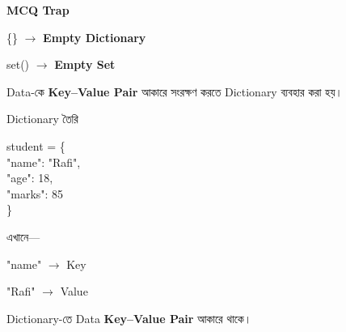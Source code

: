 \begin{rememberbox}

\textbf{\color{deepOrange}MCQ Trap}

\begin{center}

\textenglish{\ttfamily \{\}}
\(\longrightarrow\)
\textbf{Empty Dictionary}

\qquad

\textenglish{\ttfamily set()}
\(\longrightarrow\)
\textbf{Empty Set}

\end{center}

\end{rememberbox}



Data-কে \textbf{Key--Value Pair} আকারে সংরক্ষণ করতে
Dictionary ব্যবহার করা হয়।

\begin{codeoutputbox}{Dictionary তৈরি}

\noindent
\begin{minipage}[t]{0.56\linewidth}
\codeheading

\begin{english}
\ttfamily
student = \{\\
\hspace*{4mm}"name": "Rafi",\\
\hspace*{4mm}"age": 18,\\
\hspace*{4mm}"marks": 85\\
\}
\end{english}

\end{minipage}
\hfill
\begin{minipage}[t]{0.40\linewidth}
\outputheading

এখানে—

\textenglish{\ttfamily "name"}
\(\longrightarrow\)
Key

\textenglish{\ttfamily "Rafi"}
\(\longrightarrow\)
Value

\medskip

Dictionary-তে Data
\textbf{Key--Value Pair}
আকারে থাকে।

\end{minipage}

\end{codeoutputbox}

